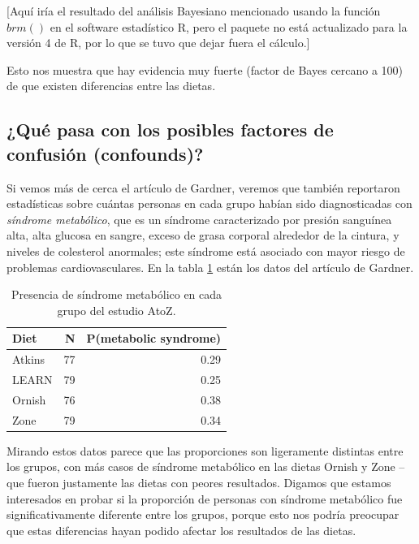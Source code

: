 \documentclass[
  12pt,
]{book}
\begin{document}
{[}Aquí iría el resultado del análisis Bayesiano mencionado usando la función \(brm()\) en el software estadístico R, pero el paquete no está actualizado para la versión 4 de R, por lo que se tuvo que dejar fuera el cálculo.{]}

Esto nos muestra que hay evidencia muy fuerte (factor de Bayes cercano a 100) de que existen diferencias entre las dietas.

\hypertarget{quuxe9-pasa-con-los-posibles-factores-de-confusiuxf3n-confounds}{%
\subsection{¿Qué pasa con los posibles factores de confusión (confounds)?}\label{quuxe9-pasa-con-los-posibles-factores-de-confusiuxf3n-confounds}}

Si vemos más de cerca el artículo de Gardner, veremos que también reportaron estadísticas sobre cuántas personas en cada grupo habían sido diagnosticadas con \emph{síndrome metabólico}, que es un síndrome caracterizado por presión sanguínea alta, alta glucosa en sangre, exceso de grasa corporal alrededor de la cintura, y niveles de colesterol anormales; este síndrome está asociado con mayor riesgo de problemas cardiovasculares. En la tabla \ref{tab:metabolicSyndrome} están los datos del artículo de Gardner.

\begin{table}

\caption{\label{tab:metabolicSyndrome}Presencia de síndrome metabólico en cada grupo del estudio AtoZ.}
\centering
\begin{tabular}[t]{l|r|r}
\hline
Diet & N & P(metabolic syndrome)\\
\hline
Atkins & 77 & 0.29\\
\hline
LEARN & 79 & 0.25\\
\hline
Ornish & 76 & 0.38\\
\hline
Zone & 79 & 0.34\\
\hline
\end{tabular}
\end{table}

Mirando estos datos parece que las proporciones son ligeramente distintas entre los grupos, con más casos de síndrome metabólico en las dietas Ornish y Zone -- que fueron justamente las dietas con peores resultados. Digamos que estamos interesados en probar si la proporción de personas con síndrome metabólico fue significativamente diferente entre los grupos, porque esto nos podría preocupar que estas diferencias hayan podido afectar los resultados de las dietas.
\end{document}
